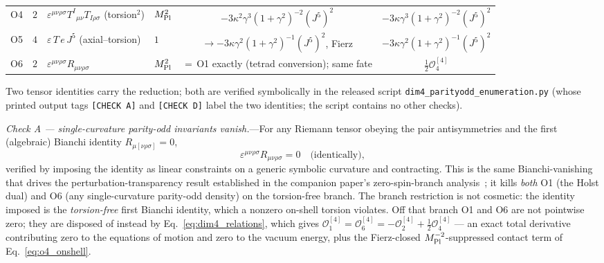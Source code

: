 \documentclass[aps,prd,twocolumn,superscriptaddress,showpacs,preprintnumbers,nofootinbib,longbibliography,floatfix]{revtex4-2}
\newcommand{\MPl}{M_{\rm Pl}}
\begin{document}
\begin{table}[t]
\begin{ruledtabular}
\begin{tabular}{ccllcc}
O4 & $2$ & $\varepsilon^{\mu\nu\rho\sigma}T^{I}{}_{\mu\nu}T_{I\rho\sigma}$ (torsion$^2$) & $\MPl^{2}$ & $-3\kappa^2\gamma^3(1{+}\gamma^2)^{-2}(J^5)^2$ & $-3\kappa\gamma^3(1{+}\gamma^2)^{-2}(J^5)^2$ \\
O5 & $4$ & $\varepsilon\,T\,e\,J^5$ (axial--torsion) & $1$ & $\to-3\kappa\gamma^2(1{+}\gamma^2)^{-1}(J^5)^2$, Fierz & $-3\kappa\gamma^2(1{+}\gamma^2)^{-1}(J^5)^2$ \\
O6 & $2$ & $\varepsilon^{\mu\nu\rho\sigma}R_{\mu\nu\rho\sigma}$ & $\MPl^{2}$ & $=\,$O1 exactly (tetrad conversion); same fate & $\tfrac12\mathcal{O}_4^{[4]}$ \\
\end{tabular}
\end{ruledtabular}
\end{table}

Two tensor identities carry the reduction; both are verified symbolically
in the released script
\texttt{dim4\_parityodd\_enumeration.py} (whose printed
output tags \texttt{[CHECK A]} and \texttt{[CHECK D]} label the two
identities; the script contains no other checks).

\textit{Check A --- single-curvature parity-odd invariants vanish.}---For any
Riemann tensor obeying the pair antisymmetries and the first (algebraic)
Bianchi identity $R_{\mu[\nu\rho\sigma]}=0$,
\begin{equation}
\varepsilon^{\mu\nu\rho\sigma}R_{\mu\nu\rho\sigma}=0
\quad\text{(identically)},
\label{eq:dim4_bianchi_vanish}
\end{equation}
verified by imposing the identity as linear constraints on a generic
symbolic curvature and contracting. This is the same Bianchi-vanishing that
drives the perturbation-transparency result established in the companion
paper's zero-spin-branch analysis~\cite{Golden2026P1a}; it kills \emph{both} O1 (the Holst dual)
and O6 (any single-curvature parity-odd density) on the torsion-free branch.
The branch restriction is not cosmetic: the identity imposed is the
\emph{torsion-free} first Bianchi identity, which a nonzero on-shell
torsion violates. Off that branch O1 and O6 are not pointwise zero; they
are disposed of instead by Eq.~\eqref{eq:dim4_relations}, which gives
$\mathcal{O}_1^{[4]}=\mathcal{O}_6^{[4]}
=-\mathcal{O}_2^{[4]}+\tfrac12\mathcal{O}_4^{[4]}$ --- an exact
total derivative contributing zero to the equations of motion and zero to
the vacuum energy, plus the Fierz-closed $\MPl^{-2}$-suppressed contact
term of Eq.~\eqref{eq:o4_onshell}.
\end{document}

